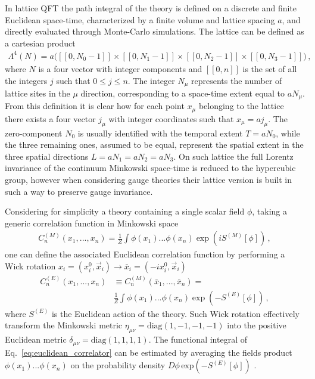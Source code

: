 %
In lattice QFT the path integral of the theory is defined on a discrete and finite Euclidean space-time,
characterized by a finite volume and lattice spacing $a$, and directly evaluated through Monte-Carlo simulations.
The lattice can be defined as a cartesian product
\begin{align}
    \label{eq:lattice_def}
    \Lambda^4\left(N\right) = a\Big([\![0, N_0-1 ]\!]\times[\![0, N_1-1 ]\!]\times[\![0, N_2-1 ]\!]
    \times[\![0, N_3-1 ]\!] \Big)\,,
\end{align}
where $N$ is a four vector with integer components and $[\![0, n ]\!]$ is the set of all the integers $j$ such that
$0 \le j \le n$. The integer $N_{\mu}$ represents the number of lattice sites in the $\mu$ direction, corresponding
to a space-time extent equal to $a N_{\mu}$. 
From this definition it is clear how for each point $x_{\mu}$ belonging to the lattice there exists a four vector $j_{\mu}$ 
with integer coordinates such that $x_{\mu} = a j_{\mu}$. 
The zero-component $N_0$ is usually identified with the temporal extent
$T = a N_0$, while the three remaining ones, assumed to be equal, represent the spatial extent in the three spatial directions
$L = a N_1 = a N_2 = a N_3$. On such lattice the full Lorentz invariance of the continuum 
Minkowski space-time is reduced to the hypercubic group, 
however when considering gauge theories their lattice version is built in such a way to preserve gauge invariance. 

Considering for simplicity a theory containing a single scalar field $\phi$,
taking a generic correlation function in Minkowski space 
\begin{align}
    C_n^{(M)}\left(x_1,..., x_n\right) = 
    \frac{1}{Z} \int \phi\left(x_1\right)...\phi\left(x_n\right)\exp\left(i S^{(M)}\left[\phi\right]\right)\,,
\end{align}
one can define the associated Euclidean correlation function
by performing a Wick rotation $x_i = \left(x^0_i, \vec{x}_i\right) \rightarrow \bar{x}_i = \left(-i x^0_i, \vec{x}_i\right)$
\begin{align}
    \label{eq:euclidean_correlator}
    C_n^{(E)}\left(x_1,..., x_n\right) &\equiv C_n^{(M)}\left(\bar{x}_1,..., \bar{x}_n\right) = \nonumber \\
    &\frac{1}{Z} \int \phi\left(x_1\right)...\phi\left(x_n\right)\exp\left(- S^{(E)}\left[\phi\right]\right)\,,
\end{align}
where $S^{(E)}$ is the Euclidean action of the theory.
Such Wick rotation effectively transform the Minkowski metric $\eta_{\mu\nu} = \text{diag}\left(1,-1,-1,-1\right)$
into the positive Euclidean metric $\delta_{\mu\nu} = \text{diag}\left(1,1,1,1\right)$.
The functional integral of Eq.~\eqref{eq:euclidean_correlator} can be estimated
by averaging the fields product $\phi\left(x_1\right)...\phi\left(x_n\right)$ on the probability density 
$D\phi \, \text{exp}\left(-S^{(E)}\left[\phi\right]\right)$ .


